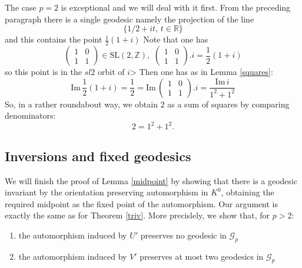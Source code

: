 \documentclass[12pt,a4paper]{amsart}
\def\im{\mathrm{Im}\,}
\def\ZZ{\mathbb{Z}}
\def\RR{\mathbb{R}}
\def\sl2{\mathrm{SL}(2, \ZZ)}
\def\ggp{\mathcal{G}_p}
\begin{document}
The case $p=2$ is exceptional and we will deal with it first.
From the preceding paragraph there is a single geodesic namely 
the projection of the line 
$$\{ 1/2 + i t,\, t \in \RR \}$$
and this contains the point  $\frac{1}{2 }(1+ i)$
Note that one has 
$$\begin{pmatrix}
1 & 0 \\
1 & 1
\end{pmatrix} \in \sl2,\,\, \begin{pmatrix}
1 & 0 \\
1 & 1
\end{pmatrix}.i  = \frac{1}{2 }(1+ i)$$
so this point is in the $sl2$ orbit of $i$>
Then one has as in Lemma \ref{squares}:
$$\im \frac{1}{2 }(1+ i) = \frac{1}{2}  =  \im \begin{pmatrix}
1 & 0 \\
1 & 1
\end{pmatrix}.i = \frac{\im i}{ 1^2 + 1^2}$$
So, in a rather roundabout way, we obtain $2$ as a sum of squares by comparing denominators:
$$2 = 1^2 + 1^2.$$




\subsection{Inversions and fixed geodesics}

We will finish the proof of  Lemma \ref{midpoint}
by showing that there is a geodesic invariant by 
the orientation preserving automorphism in $K^0$,
obtaining the required midpoint as the fixed point of the automorphism.
Our  argument is exactly  the same as for
 Theorem \ref{triv}.
 More precislely, we show that, for $p > 2$:
\begin{enumerate}
\item the automorphism induced by $U'$ preserves no geodesic in  $\ggp$
\item the automorphism induced by $V'$ preserves at most two geodesics in $\ggp$
\end{enumerate}
\end{document}

